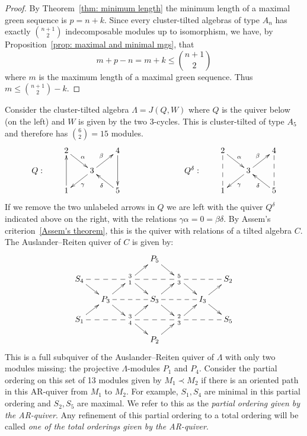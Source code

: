 \documentclass[ALCO,ThmDefs,Unicode,epreuves]{cedram}
\begin{document}
\begin{proof}
By Theorem~\ref{thm: minimum length} the minimum length of a maximal green sequence is $p=n+k$. Since every cluster-tilted algebras of type $A_n$ has exactly $\binom{n+1}2$ indecomposable modules up to isomorphism, we have, by Proposition~\ref{prop: maximal and minimal mgs}, that
\[
	m+p-n=m+k\le \binom{n+1}2
\]
where $m$ is the maximum length of a maximal green sequence. Thus $m\le \binom{n+1}2-k$.
\end{proof}

\begin{exam}\label{eg: A5 tilted algebra example}
Consider the cluster-tilted algebra $\Lambda=J(Q,W)$ where $Q$ is the quiver below (on the left) and $W$ is given by the two 3-cycles. This is cluster-tilted of type $A_5$ and therefore has $\binom62=15$ modules.
\[
\xymatrixrowsep{10pt}\xymatrixcolsep{20pt}
\xymatrix{%
&2\ar[dr]^\alpha &&4\ar[dd] &&&& 2\ar[dr]^\alpha &&4\\
Q:&& 3\ar[ru]^\beta\ar[ld]^\gamma&&&&Q^\delta:&& 3\ar[ru]^\beta\ar[ld]^\gamma\\
&1\ar[uu] && 5\ar[lu]^\delta&&&&1\ar@{--}[uu] && 5\ar[lu]^\delta\ar@{--}[uu]
	}%
\]
If we remove the two unlabeled arrows in $Q$ we are left with the quiver $Q^\delta$ indicated above on the right, with the relations $\gamma\alpha=0=\beta\delta$. By Assem's criterion~\ref{Assem's theorem}, this is the quiver with relations of a tilted algebra $C$. The Auslander--Reiten quiver of $C$ is given by:
\[
\xymatrixrowsep{8pt}\xymatrixcolsep{15pt}
\xymatrix{%
&&&P_5\ar[rd]\\
S_4\ar[dr]\ar@{--}[rr] &&%
\genfrac{}{}{0pt}{1}{3}{1}\ar@{--}[rr]\ar[dr]\ar[ur] && 
\genfrac{}{}{0pt}{1}{5}{3}
\ar[dr]\ar@{--}[rr]&&S_2\\
& P_3\ar@{--}[rr]\ar[dr]\ar[ur] && S_3\ar@{--}[rr]\ar[dr]\ar[ur] && I_3\ar[dr]\ar[ur] \\
S_1\ar[ur]\ar@{--}[rr] && 
\genfrac{}{}{0pt}{1}{3}{4}
\ar@{--}[rr]\ar[dr]\ar[ur] &&
\genfrac{}{}{0pt}{1}{2}{3}
\ar[ur]\ar@{--}[rr]&&S_5\\
&&&P_2\ar[ru]
	}%
\]
This is a full subquiver of the Auslander--Reiten quiver of $\Lambda$ with only two modules missing: the projective $\Lambda$-modules $P_1$ and $P_4$. Consider the partial ordering on this set of 13 modules given by $M_1\prec M_2$ if there is an oriented path in this AR-quiver from $M_1$ to $M_2$. For example, $S_1,S_4$ are minimal in this partial ordering and $S_2,S_5$ are maximal. We refer to this as the \emph{partial ordering given by the AR-quiver}. Any refinement of this partial ordering to a total ordering will be called \emph{one of the total orderings given by the AR-quiver}.


\end{exam}
\end{document}

